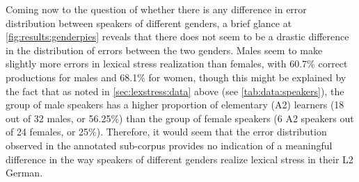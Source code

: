 				
				Coming now to the question of whether there is any difference in error distribution between speakers of different genders, a brief glance at \cref{fig:results:genderpies} reveals that there does not seem to be a drastic difference in the distribution of errors between the two genders. Males seem to make slightly more errors in lexical stress realization than females, with 60.7\% correct productions for males and 68.1\% for women, though this might be explained by the fact that as noted in \cref{sec:lexstress:data} above (see \cref{tab:data:speakers}), the group of male speakers has a higher proportion of elementary (A2) learners (18 out of 32 males, or 56.25\%) than the group of female speakers (6 A2 speakers out of 24 females, or 25\%).  Therefore, it would seem that the error distribution observed in the annotated sub-corpus provides no indication of a meaningful difference in the way speakers of different genders realize lexical stress in their L2 German.
				
			
		
